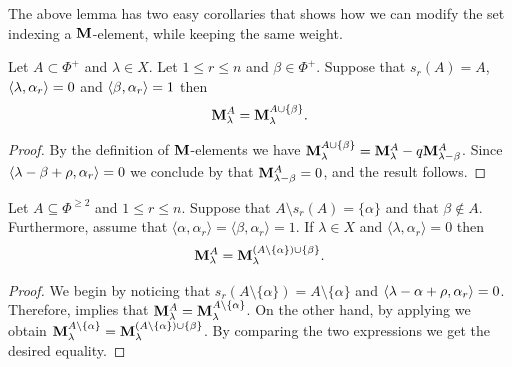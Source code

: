 The above lemma has two easy corollaries that shows how we can modify the set indexing a $\mathbf{M}$-element, while keeping the same weight. 

\begin{corollary}\label{coro puedo agregar}
    Let $A\subset \Phi^+$ and $\lambda \in X$.  
    Let $ 1\leq r \leq n$ and $\beta \in \Phi^+$.
    Suppose that $s_r(A)=A$,  $\langle \lambda , \alpha_r \rangle=0$ and $\langle \beta , \alpha_r \rangle =1$ then 
    \begin{equation}
        \mathbf{M}_{\lambda}^{A} = \mathbf{M}_{\lambda}^{A\cup \{\beta\} }.
    \end{equation}
\end{corollary}

\begin{proof}
By the definition of $\mathbf{M}$-elements we have $\mathbf{M}_{\lambda}^{A\cup \{\beta\} } = \mathbf{M}_{\lambda}^{A} -q \mathbf{M}_{\lambda -\beta }^{A}  $. 
Since $\langle \lambda -\beta +\rho , \alpha_r \rangle=0$ we conclude by  that $\mathbf{M}_{\lambda -\beta }^{A}=0$, and the result follows. 
\end{proof}

\begin{corollary}\rm\label{lem: sacar una poner otra}
    Let $A\subseteq \Phi^{\geq 2} $ and $1\leq r \leq n$. Suppose that $A\setminus s_r(A)=\{\alpha \}$ and that $ \beta \notin A$. Furthermore, assume that $\langle  \alpha, \alpha_r \rangle = \langle   \beta , \alpha_r  \rangle =1$. If $\lambda \in X$ and $\langle \lambda , \alpha_r \rangle =0$ then 
    \begin{equation}
        \mathbf{M}_{\lambda}^A = \mathbf{M}_{\lambda}^{(A\setminus \{\alpha\}) \cup \{\beta\}  }. 
    \end{equation}
\end{corollary}

\begin{proof}
   We begin by noticing that $s_r(A\setminus \{ \alpha  \}) = A\setminus \{ \alpha \}$ and $\langle \lambda -\alpha +\rho , \alpha_r \rangle=0$. Therefore,  implies that $\mathbf{M}_\lambda^A =\mathbf{M}_{\lambda}^{A\setminus \{\alpha\}}$. 
   On the other hand, by applying  we obtain $\mathbf{M}_{\lambda}^{A\setminus \{\alpha \}} = \mathbf{M}_{\lambda}^{(A\setminus \{\alpha\}) \cup \{\beta\}  } $.
   By comparing the two expressions we get the desired equality. 
\end{proof}






